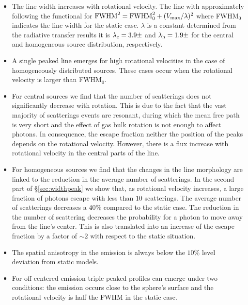 \documentclass{emulateapj}
\newcommand{\ly}{{\ifmmode{{\rm Ly}\alpha~}\else{Ly$\alpha$~}\fi}}
\begin{document}
\begin{itemize}

\item The line width increases with rotational velocity. The line with
  approximately following the functional for  ${\rm FWHM}^2 = {\rm FWHM}_{
    0}^2 + (V_{\rm max}/\lambda)^2$ where FWHM$_{0}$ indicates the line
  width for the static case. $\lambda$ is a constant determined from
  the radiative transfer results it is $\lambda_{\rm c}=3.9\pm$ and
  $\lambda_{\rm h}=1.9\pm$ for the central and homogeneous source
  distribution, respectively.


\item A single peaked line emerges for high rotational velocities in
  the case of homogeneously distributed sources. These cases occur when
  the rotational velocity is larger than FWHM$_0$.  

\item For central sources we find that the number of scatterings
does not significantly decrease with rotation. This is due to the 
fact that the vast majority of scatterings events are resonant, 
during which the mean free path is very short and the effect of gas
bulk rotation is not enough to affect \ly photons. In consequence, 
the escape fraction neither the position of the peaks depends on the
rotational velocity. However, there is a flux increase with rotational
velocity in the central parts of the line.


\item For homogeneous sources we find that the changes in the
line morphology are linked to the reduction in the average number of
scatterings. In the second part of \S \ref{sec:widthpeak} we show
that, as rotational velocity increases, a large fraction of photons
escape with less than $10$ scatterings. The average number of
scatterings decreases a $40\%$ compared to the static case. 
The reduction in the number of scattering decreases the probability
for a photon to move away from the line's center. This is also
translated into an increase of the escape fraction by a factor of
$\sim 2$ with respect to the static situation.

\item The spatial anisotropy in the emission is always below the
  $10\%$ level deviation from static models.

\item For off-centered emission triple peaked profiles can emerge
  under two conditions: the emission occurs close to the sphere's
  surface and the rotational velocity is half the FWHM in the static
  case.   
\end{itemize}
\end{document}
